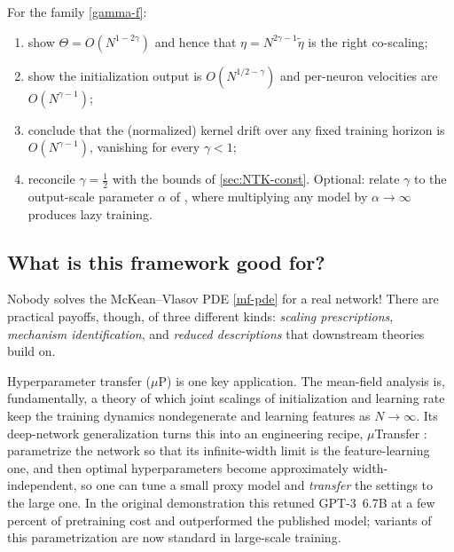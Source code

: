 \documentclass[11pt]{article}
\begin{document}
\begin{exercise}
\label{ex:gamma}
For the family \eqref{gamma-f}:
\begin{enumerate}
  \item show $\Theta = O(N^{1-2\gamma})$ and hence that $\eta = N^{2\gamma-1}\tilde\eta$ is the right co-scaling;
  \item show the initialization output is $O(N^{1/2-\gamma})$ and per-neuron velocities are $O(N^{\gamma-1})$;
  \item conclude that the (normalized) kernel drift over any fixed training horizon is $O(N^{\gamma-1})$, vanishing for every $\gamma<1$;
  \item reconcile $\gamma=\frac{1}{2}$ with the bounds of \cref{sec:NTK-const}. Optional: relate $\gamma$ to the output-scale parameter $\alpha$ of \cite{chizat2019lazy}, where multiplying any model by $\alpha\to\infty$ produces lazy training.
\end{enumerate}
\end{exercise}

\subsection{What is this framework good for?}
\label{sec:MFT-practice}

Nobody solves the McKean--Vlasov PDE \eqref{mf-pde} for a real network! There are practical payoffs, though, of three different kinds: \emph{scaling prescriptions}, \emph{mechanism identification}, and \emph{reduced descriptions} that downstream theories build on.

Hyperparameter transfer ($\mu$P) is one key application. The mean-field analysis is, fundamentally, a theory of which joint scalings of initialization and learning rate keep the training dynamics nondegenerate and learning features as $N\to\infty$. Its deep-network generalization \cite{yang2021tensor} turns this into an engineering recipe, $\mu$Transfer \cite{yang2022tensor}: parametrize the network so that its infinite-width limit is the feature-learning one, and then optimal hyperparameters become approximately width-independent, so one can tune a small proxy model and \emph{transfer} the settings to the large one. In the original demonstration this retuned GPT-3~6.7B at a few percent of pretraining cost and outperformed the published model; variants of this parametrization are now standard in large-scale training. 
\end{document}
